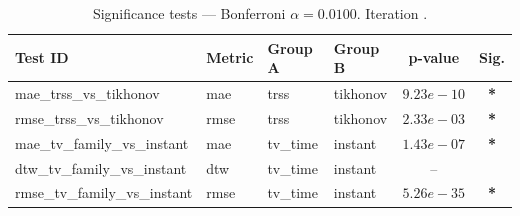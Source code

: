 ﻿%
\begin{table}[ht]
\centering
\caption[EEG reconstruction - Iteration it08]{Significance tests — Bonferroni $\alpha=0.0100$. Iteration .}
\label{tab:sig_it08_high_missing_synthetic}
\small
\begin{tabular}{llllcc}
\toprule
Test ID & Metric & Group A & Group B & p-value & Sig. \\
\midrule
mae\_trss\_vs\_tikhonov & mae & trss & tikhonov & $9.23e-10$ & \textbf{*} \\
rmse\_trss\_vs\_tikhonov & rmse & trss & tikhonov & $2.33e-03$ & \textbf{*} \\
mae\_tv\_family\_vs\_instant & mae & tv\_time & instant & $1.43e-07$ & \textbf{*} \\
dtw\_tv\_family\_vs\_instant & dtw & tv\_time & instant & -- &  \\
rmse\_tv\_family\_vs\_instant & rmse & tv\_time & instant & $5.26e-35$ & \textbf{*} \\
\bottomrule
\end{tabular}
\end{table}







